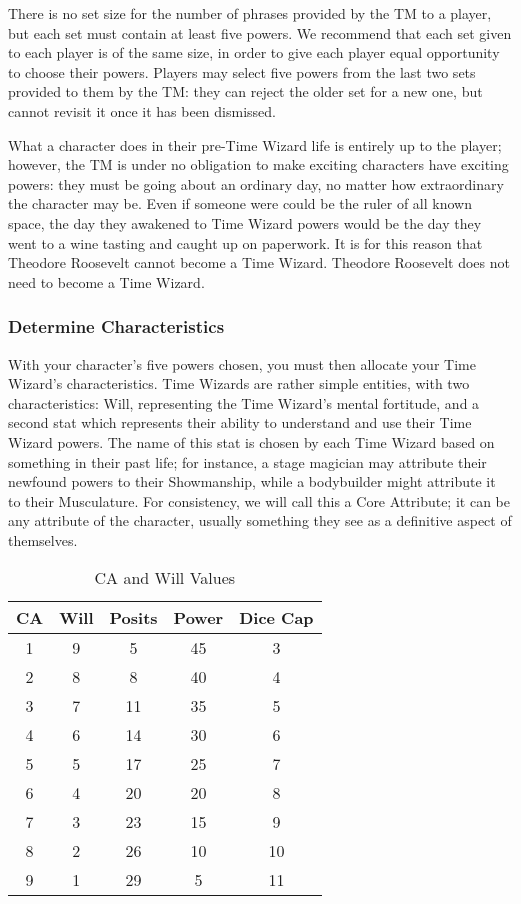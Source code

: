 \documentclass[twoside]{article}
\begin{document}
There is no set size for the number of phrases provided by the TM to a player, but each set must
contain at least five powers. We recommend that each set given to each player is of the same
size, in order to give each player equal opportunity to choose their powers. Players may select
five powers from the last two sets provided to them by the TM: they can reject the older set for
a new one, but cannot revisit it once it has been dismissed.

What a character does in their pre-Time Wizard life is entirely up to the player; however, the
TM is under no obligation to make exciting characters have exciting powers: they must be
going about an ordinary day, no matter how extraordinary the character may be. Even if someone
were could be the ruler of all known space, the day they awakened to Time Wizard powers would be
the day they went to a wine tasting and caught up on paperwork. It is for this reason that
Theodore Roosevelt cannot become a Time Wizard. Theodore Roosevelt does not need to become a
Time Wizard.

\subsubsection{Determine Characteristics} \label{ssec:get-characteristics}
With your character's five powers chosen, you must then allocate your Time Wizard's
characteristics. Time Wizards are rather simple entities, with two characteristics: Will,
representing the Time Wizard's mental fortitude, and a second stat which represents their
ability to understand and use their Time Wizard powers. The name of this stat is chosen by each
Time Wizard based on something in their past life; for instance, a stage magician may attribute
their newfound powers to their Showmanship, while a bodybuilder might attribute it to their
Musculature. For consistency, we will call this a Core Attribute; it can be any attribute of the
character, usually something they see as a definitive aspect of themselves.

\begin{wraptable}{o}{0.5\textwidth}
   \caption{CA and Will Values}
   \label{tab:cawill}

   \begin{tabular}{cc|ccc}
   \textbf{CA} & \textbf{Will} & Posits & Power & Dice Cap\\ \hline
      1 & 9 &  5 & 45 &  3\\
      2 & 8 &  8 & 40 &  4\\
      3 & 7 & 11 & 35 &  5\\
      4 & 6 & 14 & 30 &  6\\
      5 & 5 & 17 & 25 &  7\\
      6 & 4 & 20 & 20 &  8\\
      7 & 3 & 23 & 15 &  9\\
      8 & 2 & 26 & 10 & 10\\
      9 & 1 & 29 &  5 & 11
   \end{tabular}
\end{wraptable}
\end{document}
